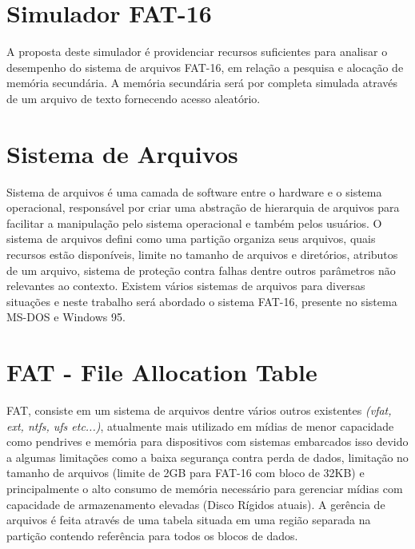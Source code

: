\documentclass{article}
\begin{document}
	
	
\section{Simulador FAT-16} 
	A proposta deste simulador é providenciar recursos suficientes para analisar o desempenho do sistema de arquivos FAT-16, em relação a pesquisa e alocação de memória secundária. A memória secundária será por completa simulada através de um arquivo de texto fornecendo acesso aleatório. 

\section{Sistema de Arquivos} 
	Sistema de arquivos é uma camada de software entre o hardware e o sistema operacional, responsável por criar uma abstração de hierarquia de arquivos para facilitar a manipulação pelo sistema operacional e também pelos usuários. O sistema de arquivos defini como uma partição organiza seus arquivos, quais recursos estão disponíveis, limite no tamanho de arquivos e diretórios, atributos de um arquivo, sistema de proteção contra falhas dentre outros parâmetros não relevantes ao contexto. Existem vários sistemas de arquivos para diversas situações e neste trabalho será abordado o sistema FAT-16, presente no sistema MS-DOS e Windows 95. 

\section{FAT - File Allocation Table} 
	FAT, consiste em um sistema de arquivos dentre vários outros existentes \textit{(vfat, ext, ntfs, ufs etc...)}, atualmente mais utilizado em mídias de menor capacidade como pendrives e memória para dispositivos com sistemas embarcados isso devido a algumas limitações como a baixa segurança contra perda de dados, limitação no tamanho de arquivos (limite de 2GB para FAT-16 com bloco de 32KB) e principalmente o alto consumo de memória necessário para gerenciar mídias com capacidade de armazenamento elevadas (Disco Rígidos atuais). 
	A gerência de arquivos é feita através de uma tabela situada em uma região separada na partição contendo referência para todos os blocos de dados.  
\end{document}
